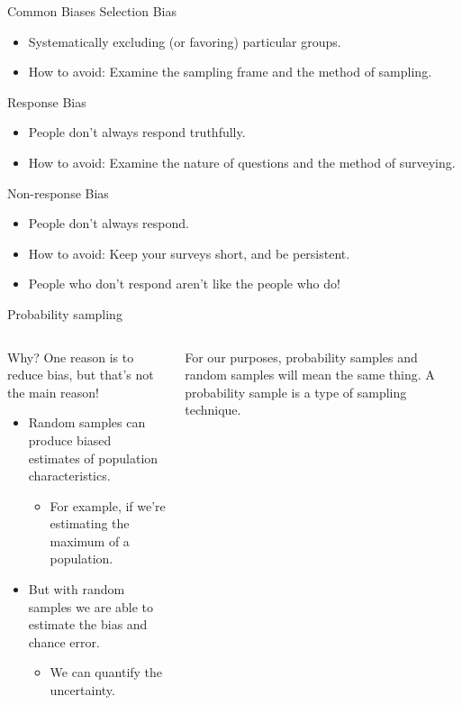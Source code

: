 \documentclass[aspectratio=169]{../latex_main/tntbeamer}  %
\begin{document}
	
	\begin{frame}{Common Biases}
	    Selection Bias
        \begin{itemize}
            \item Systematically excluding (or favoring) particular groups.
            \item How to avoid: Examine the sampling frame and the method of sampling.
        \end{itemize}
        Response Bias
        \begin{itemize}
            \item People don’t always respond truthfully.
            \item How to avoid: Examine the nature of questions and the method of surveying.
        \end{itemize}
        Non-response Bias
        \begin{itemize}
            \item People don’t always respond.
            \item How to avoid: Keep your surveys short, and be persistent.
            \item People who don’t respond aren’t like the people who do!
        \end{itemize}
	\end{frame}
	
	
		\begin{frame}{Probability sampling}
	    \begin{columns}
	        \begin{column}{.4\textwidth}
	            Why? One reason is to reduce bias, but that’s not the main reason!
	            \begin{itemize}
	                \item Random samples can produce biased estimates of population characteristics.
	                \begin{itemize}
	                    \item For example, if we’re estimating the maximum of a population.
	                \end{itemize}
	                \item But with random samples we are able to estimate the bias and chance error.
	                \begin{itemize}
	                    \item We can quantify the uncertainty.
	                \end{itemize}
	            \end{itemize}
	        \end{column}
	        
	        \begin{column}{.5\textwidth}
	            For our purposes, probability samples and random samples will mean the same thing.
	            \bigskip
	            A probability sample is a type of sampling technique.
	        \end{column}
	        
	    \end{columns}
	    
	\end{frame}
	
\end{document}
